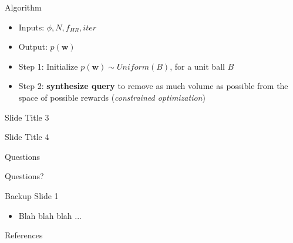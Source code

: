 \documentclass[9pt,mathserif]{beamer}
\begin{document}
\begin{frame}[t]{Algorithm}
	\begin{itemize}	\itemsep 0.05in
		\item Inputs: $\phi, N, f_{HR}, iter$
		\item Output: $p(\textbf{w})$
		\item Step 1: Initialize $p(\textbf{w}) \sim Uniform(B)$, for a unit ball $B$
		\item Step 2: \textbf{synthesize query} to remove as much volume as possible from the space of possible rewards (\textit{constrained optimization})
	\end{itemize}

\end{frame}

\begin{frame}[t]{Slide Title 3}

\end{frame}

\begin{frame}[t]{Slide Title 4}

\end{frame}

\begin{frame}[t]{Questions}
	\begin{center} \Huge Questions? \end{center}
\end{frame}

\setcounter{finalframe}{\value{framenumber}}

\begin{frame}[t]{Backup Slide 1}
	\begin{itemize} %
		\item Blah blah blah ...
	\end{itemize}
\end{frame}

\begin{frame}[allowframebreaks]{References}
	\tiny
	\def\newblock{}
\end{frame}

\setcounter{framenumber}{\value{finalframe}}
\end{document}
